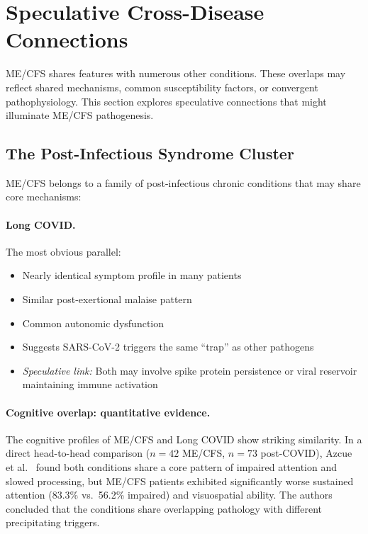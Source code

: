 \section{Speculative Cross-Disease Connections}
\label{sec:cross-disease}

ME/CFS shares features with numerous other conditions. These overlaps may reflect shared mechanisms, common susceptibility factors, or convergent pathophysiology. This section explores speculative connections that might illuminate ME/CFS pathogenesis.

\subsection{The Post-Infectious Syndrome Cluster}

ME/CFS belongs to a family of post-infectious chronic conditions that may share core mechanisms:

\paragraph{Long COVID.} The most obvious parallel:
\begin{itemize}
    \item Nearly identical symptom profile in many patients
    \item Similar post-exertional malaise pattern
    \item Common autonomic dysfunction
    \item Suggests SARS-CoV-2 triggers the same ``trap'' as other pathogens
    \item \textit{Speculative link:} Both may involve spike protein persistence or viral reservoir maintaining immune activation
\end{itemize}

\paragraph{Cognitive overlap: quantitative evidence.}
The cognitive profiles of ME/CFS and Long COVID show striking similarity. In a direct head-to-head comparison ($n = 42$ ME/CFS, $n = 73$ post-COVID), Azcue et al.~\cite{Azcue2022brainfog} found both conditions share a core pattern of impaired attention and slowed processing, but ME/CFS patients exhibited significantly worse sustained attention (83.3\% vs.\ 56.2\% impaired) and visuospatial ability. The authors concluded that the conditions share overlapping pathology with different precipitating triggers.

